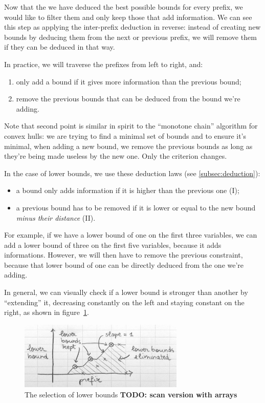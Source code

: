 \documentclass[a4paper,10pt]{article}
\begin{document}
Now that the we have deduced the best possible bounds for every prefix, we would like to filter them and only keep those that add information. We can see this step as applying the inter-prefix deduction in reverse: instead of creating new bounds by deducing them from the next or previous prefix, we will remove them if they can be deduced in that way.

In practice, we will traverse the prefixes from left to right, and:
\begin{enumerate}
    \item only add a bound if it gives more information than the previous bound;
    \item remove the previous bounds that can be deduced from the bound we're adding.
\end{enumerate}

Note that second point is similar in spirit to the ``monotone chain'' algorithm for convex hulls: we are trying to find a minimal set of bounds and to ensure it's minimal, when adding a new bound, we remove the previous bounds as long as they're being made useless by the new one. Only the criterion changes.

In the case of lower bounds, we use these deduction laws (see \ref{subsec:deduction}):
\begin{itemize}
    \item a bound only adds information if it is higher than the previous one (I);
    \item a previous bound has to be removed if it is lower or equal to the new bound \emph{minus their distance} (II).
\end{itemize}

For example, if we have a lower bound of one on the first three variables, we can add a lower bound of three on the first five variables, because it adds informations. However, we will then have to remove the previous constraint, because that lower bound of one can be directly deduced from the one we're adding.

In general, we can visually check if a lower bound is stronger than another by ``extending'' it, decreasing constantly on the left and staying constant on the right, as shown in figure~\ref{fig:lower-bounds}.

\begin{figure}[h!]
    \centering
    \includegraphics[width=0.7\textwidth]{lower-bounds}
    \caption{The selection of lower bounds \textbf{TODO: scan version with arrays}}
    \label{fig:lower-bounds}
\end{figure}
\end{document}
